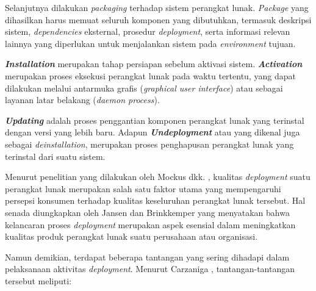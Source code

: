 Selanjutnya dilakukan \textit{packaging} terhadap sistem perangkat lunak.
\textit{Package} yang dihasilkan harus memuat seluruh komponen yang dibutuhkan,
termasuk deskripsi sistem, \textit{dependencies} eksternal, prosedur
\textit{deployment}, serta informasi relevan lainnya yang diperlukan untuk
menjalankan sistem pada \textit{environment} tujuan.

\textbf{\textit{Installation}} merupakan tahap persiapan sebelum aktivasi sistem. \textbf{\textit{Activation}} merupakan proses eksekusi perangkat lunak pada waktu tertentu, yang dapat dilakukan melalui antarmuka grafis (\textit{graphical user interface}) atau sebagai layanan latar belakang (\textit{daemon process}).

\textbf{\textit{Updating}} adalah proses penggantian komponen perangkat lunak yang terinstal dengan versi yang lebih baru. Adapun \textbf{\textit{Undeployment}} atau yang dikenal juga sebagai \textit{deinstallation}, merupakan proses penghapusan perangkat lunak yang terinstal dari suatu sistem.
\par
Menurut penelitian yang dilakukan oleh Mockus dkk. \cite{Mockus2005}, kualitas
\textit{deployment} suatu perangkat lunak merupakan salah satu faktor utama
yang mempengaruhi persepsi konsumen terhadap kualitas keseluruhan perangkat
lunak tersebut. Hal senada diungkapkan oleh Jansen dan Brinkkemper
\cite{Jansen2006} yang menyatakan bahwa kelancaran proses \textit{deployment}
merupakan aspek esensial dalam meningkatkan kualitas produk perangkat lunak
suatu perusahaan atau organisasi.

Namun demikian, terdapat beberapa tantangan yang sering dihadapi dalam
pelaksanaan aktivitas \textit{deployment}. Menurut Carzaniga
\cite{Carzaniga1998}, tantangan-tantangan tersebut meliputi:

